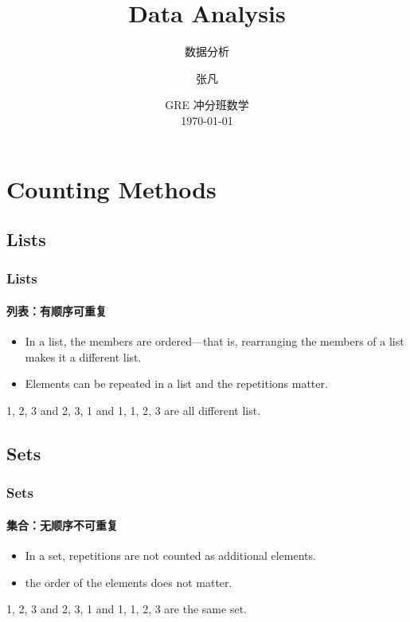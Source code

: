 \documentclass[
	11pt, %
	handout,
]{beamer}
\title[Data Analysis]{Data Analysis} %
\subtitle{数据分析} %
\author[张凡]{张凡} %
\institute[XDF]{新东方国际教育 \\ \smallskip \textit{zhangfan@xdf.cn}} %
\date[\today]{GRE 冲分班数学 \\ \today} %
\begin{document}

\begin{frame}
	\titlepage %
\end{frame}




\section{Counting Methods}


\subsection{Lists}
\begin{frame}
	\frametitle{Lists} %
	\framesubtitle{列表：有顺序可重复}
	\begin{definition}
		\begin{itemize}
			\item In a list, the members are ordered—that is, rearranging the members of a list makes it a different list.
			\item Elements can be repeated in a list and the repetitions matter.
		\end{itemize}
	\end{definition}
	\begin{example}
		1, 2, 3 and 2, 3, 1 and 1, 1, 2, 3 are all different list. 
	\end{example}
\end{frame}


\subsection{Sets}
\begin{frame}
	\frametitle{Sets} %
	\framesubtitle{集合：无顺序不可重复}
	\begin{definition}
		\begin{itemize}
			\item In a set, repetitions are
not counted as additional elements.
			\item the order of the elements does not
matter.
		\end{itemize}
	\end{definition}
	\begin{example}
		{1, 2, 3} and {2, 3, 1} and {1, 1, 2, 3} are the same set. 
	\end{example}
\end{frame}
\end{document}
